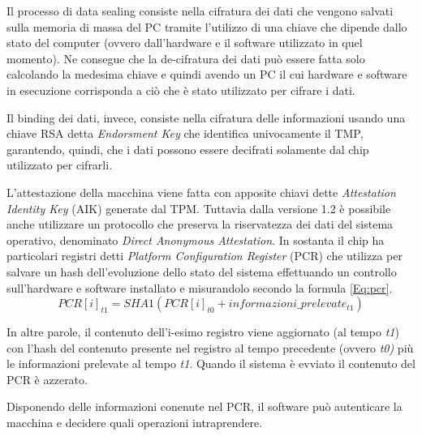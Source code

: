Il processo di data sealing consiste nella cifratura dei dati che vengono salvati sulla memoria di massa del PC tramite l'utilizzo di una chiave che dipende dallo stato del computer (ovvero dall'hardware e il software utilizzato in quel momento). Ne consegue che la de-cifratura dei dati può essere fatta solo calcolando la medesima chiave e quindi avendo un PC il cui hardware e software in esecuzione corrisponda a ciò che è stato utilizzato per cifrare i dati.

Il binding dei dati, invece, consiste nella cifratura delle informazioni usando una chiave RSA detta \textit{Endorsment Key} che identifica univocamente il TMP, garantendo, quindi, che i dati possono essere decifrati solamente dal chip utilizzato per cifrarli.

L'attestazione della macchina viene fatta con apposite chiavi dette \textit{Attestation Identity Key} (AIK) generate dal TPM. Tuttavia dalla versione 1.2 è possibile anche utilizzare un protocollo che preserva la riservatezza dei dati del sistema operativo, denominato \textit{Direct Anonymous Attestation}. In sostanta il chip ha particolari registri detti \textit{Platform Configuration Register} (PCR) che utilizza per salvare un hash dell'evoluzione dello stato del sistema effettuando un controllo sull'hardware e software installato e misurandolo secondo la formula \ref{Eq:pcr}.
    \begin{equation}
   	PCR[i]_{t1} = SHA1(PCR[i]_{t0} + informazioni\_prelevate_{t1})
    	\label{Eq:pcr}
    \end{equation}
    
In altre parole, il contenuto dell'i-esimo registro viene aggiornato (al tempo \textit{t1}) con l'hash del contenuto presente nel registro al tempo precedente (ovvero \textit{t0)} più le informazioni prelevate al tempo \textit{t1}. Quando il sistema è evviato il contenuto del PCR è azzerato.

Disponendo delle informazioni conenute nel PCR, il software può autenticare la macchina e decidere quali operazioni intraprendere.
\cite{wiki_tpm}